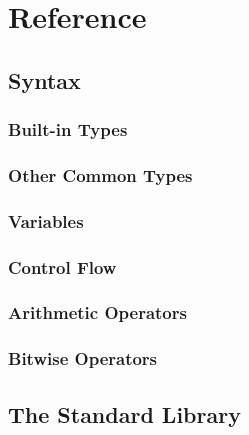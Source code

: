 \documentclass[a4paper,10pt]{report}
\begin{document}
\part{Reference}

\chapter{Syntax}

\section{Built-in Types}

\section{Other Common Types}

\section{Variables}

\section{Control Flow}

\section{Arithmetic Operators}

\section{Bitwise Operators}

\chapter{The Standard Library}
\end{document}
